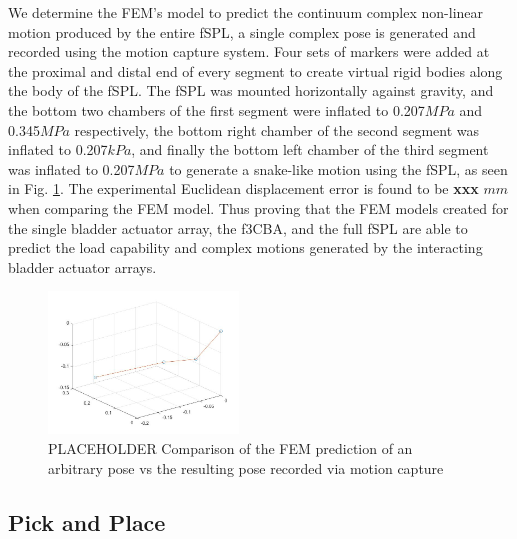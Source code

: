 \documentclass[letterpaper, 10 pt, conference]{ieeeconf}  %
\begin{document}
We determine the FEM’s model to predict the continuum complex non-linear motion produced by the entire fSPL, a single complex pose is generated and recorded using the motion capture system. Four sets of markers were added at the proximal and distal end of every segment to create virtual rigid bodies along the body of the fSPL. The fSPL was mounted horizontally against gravity, and the bottom two chambers of the first segment were inflated to 0.207$MPa$ and 0.345$MPa$ respectively, the bottom right chamber of the second segment was inflated to 0.207$kPa$, and finally the bottom left chamber of the third segment was inflated to 0.207$MPa$ to generate a snake-like motion using the fSPL, as seen in Fig. \ref{fig:pose}. The experimental Euclidean displacement error is found to be \textbf{xxx} $mm$ when comparing the FEM model. Thus proving that the FEM models created for the single bladder actuator array, the f3CBA, and the full fSPL are able to predict the load capability and complex motions generated by the interacting bladder actuator arrays.

\begin{figure}[t!]
\centering
\includegraphics[width=0.45\textwidth]{Figures/SnakePose.jpg}
\caption{PLACEHOLDER Comparison of the FEM prediction of an arbitrary pose vs the resulting pose recorded via motion capture}
\label{fig:pose}
\end{figure}







\subsection{Pick and Place}
\end{document}
